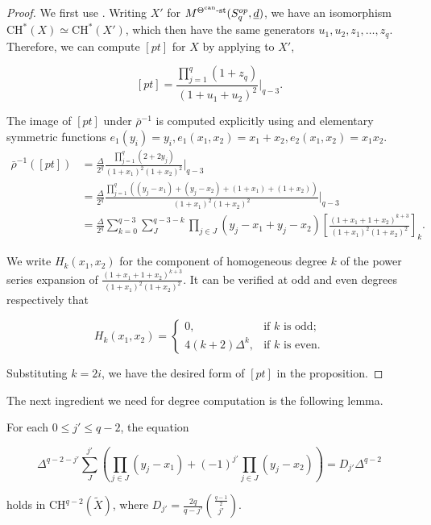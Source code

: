 \documentclass[11pt]{article}
\begin{document}
\begin{proof}
    We first use . Writing \(X'\) for \(M^{\Theta^{\text{can}}\text{-st}}(S_q^{op}, \underline{d})\), we have an isomorphism \(\mathrm{CH}^*(X)\simeq \mathrm{CH}^*(X')\), which then have the same generators \(u_1, u_2, z_1, \dots, z_q\). Therefore, we can compute \([pt]\) for \(X\) by applying  to \(X'\),

    \[
    [pt] = \frac{\prod_{j = 1}^q(1 + z_q)}{(1 + u_1 + u_2)^2}\big|_{q-3}.
    \]

    The image of \([pt]\) under \(\bar{\rho}^{-1}\) is computed explicitly using  and elementary symmetric functions \(e_1(y_i) = y_i, e_1(x_1, x_2) = x_1 + x_2, e_2(x_1, x_2) = x_1x_2\).
    \begin{align*}
        \bar{\rho}^{-1}([pt]) &= \frac{\Delta}{2^{q}}\frac{\prod_{j = 1}^q(2 + 2y_j)}{(1 + x_1)^2(1 + x_2)^2}\big|_{q-3}\\ 
        &= \frac{\Delta}{2^{q}}\frac{\prod_{j = 1}^q((y_j - x_1) + (y_j - x_2) + (1 + x_1) + (1 + x_2))}{(1 + x_1)^2(1 + x_2)^2}\big|_{q-3}\\ 
        &= \frac{\Delta}{2^{q}}\sum_{k = 0}^{q-3}\sum_J^{q-3-k}\prod_{j\in J}(y_j - x_1 + y_j - x_2)\left[\frac{(1 + x_1 + 1 + x_2)^{k+3}}{(1 + x_1)^2(1 + x_2)^2}\right]_{k}.
    \end{align*}

    We write \(H_k(x_1, x_2)\) for the component of homogeneous degree \(k\) of the power series expansion of \(\frac{(1 + x_1 + 1 + x_2)^{k+3}}{(1 + x_1)^2(1 + x_2)^2}\). It can be verified at odd and even degrees respectively that 

    \[
    H_k(x_1, x_2) = 
    \begin{cases}
        0, & \text{if \(k\) is odd;}\\ 
        4(k+2)\Delta^k, & \text{if \(k\) is even.}
    \end{cases}
    \]

    Substituting \(k = 2i\), we have the desired form of \([pt]\) in the proposition. 

\end{proof}

The next ingredient we need for degree computation is the following lemma.

\begin{lemma}\label{Lemma:point-config-alt-prod-sum-eq}
    For each \(0\leq j'\leq q-2\), the equation 

    \[
    \Delta^{q-2-j'}\sum_{J}^{j'}\left(\prod_{j\in J}(y_j - x_1) + (-1)^{j'}\prod_{j\in J}(y_j - x_2)\right) = D_{j'}\Delta^{q-2}
    \]
    
    holds in \(\mathrm{CH}^{q-2}(\tilde{X})\), where \(D_{j'} = \frac{2q}{q-j'}\binom{\frac{q-1}{2}}{j'}\).
\end{lemma}
\end{document}
